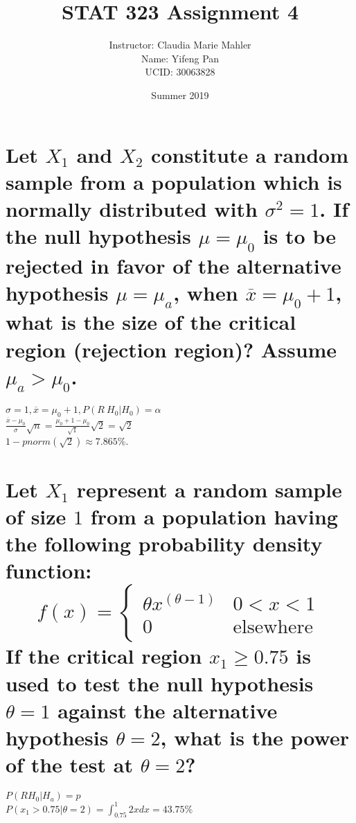 \documentclass[10pt, letterpaper, titlepage]{article}
\title{STAT 323 Assignment 4}
\author{Instructor: Claudia Marie Mahler
    \\Name: Yifeng Pan
    \\UCID: 30063828}
\date{Summer 2019}
\newcommand{\mx}{\overline{x}}
\begin{document}
    \maketitle

    \section{Let $X_1$ and $X_2$ constitute a random sample from a population which is normally distributed
        with $\sigma^2 = 1$. If the null hypothesis $\mu = \mu_0$ is to be rejected in favor of the alternative 
        hypothesis $\mu = \mu_a$, when $\mx = \mu_0 + 1$, what is the size of the critical region (rejection 
        region)? Assume $\mu_a > \mu_0$.}
        $\sigma = 1, \mx = \mu_0 + 1, P(R\ H_0 | H_0) = \alpha$\\
        $\frac{\mx - \mu_0}{\sigma}\sqrt{n} = \frac{\mu_0 + 1 - \mu_0}{\sqrt{1}}\sqrt{2} = \sqrt{2}$\\
        $1 - pnorm(\sqrt{2}) \approx 7.865\%$.

    \section[]{Let $X_1$ represent a random sample of size $1$ from a population having the following
        probability density function:
        \[
            f(x) = 
            \begin{cases}
                \theta x ^{(\theta - 1)} & 0<x<1\\
                0 & \text{elsewhere}
            \end{cases}
        \]
        If the critical region $x_1 \geq 0.75$ is used to test the null hypothesis $\theta = 1$ against the
        alternative hypothesis $\theta = 2$, what is the power of the test at $\theta = 2$?}
        $P(R H_0 | H_a) = p$\\
        $P(x_1 > 0.75 | \theta = 2) = \int_{0.75}^1{2x}dx = 43.75 \%$

\end{document}
